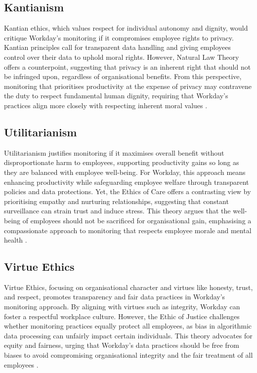 \documentclass[a4paper]{article}
\begin{document}
\subsection{Kantianism}
Kantian ethics, which values respect for individual autonomy and dignity, would critique Workday’s monitoring if it compromises employee rights to privacy. Kantian principles call for transparent data handling and giving employees control over their data to uphold moral rights. However, Natural Law Theory offers a counterpoint, suggesting that privacy is an inherent right that should not be infringed upon, regardless of organisational benefits. From this perspective, monitoring that prioritises productivity at the expense of privacy may contravene the duty to respect fundamental human dignity, requiring that Workday’s practices align more closely with respecting inherent moral values \citep{Alge2006}.

\subsection{Utilitarianism}
Utilitarianism justifies monitoring if it maximises overall benefit without disproportionate harm to employees, supporting productivity gains so long as they are balanced with employee well-being. For Workday, this approach means enhancing productivity while safeguarding employee welfare through transparent policies and data protections. Yet, the Ethics of Care offers a contrasting view by prioritising empathy and nurturing relationships, suggesting that constant surveillance can strain trust and induce stress. This theory argues that the well-being of employees should not be sacrificed for organisational gain, emphasising a compassionate approach to monitoring that respects employee morale and mental health \citep{Gerten2019}.

\subsection{Virtue Ethics}
Virtue Ethics, focusing on organisational character and virtues like honesty, trust, and respect, promotes transparency and fair data practices in Workday’s monitoring approach. By aligning with virtues such as integrity, Workday can foster a respectful workplace culture. However, the Ethic of Justice challenges whether monitoring practices equally protect all employees, as bias in algorithmic data processing can unfairly impact certain individuals. This theory advocates for equity and fairness, urging that Workday’s data practices should be free from biases to avoid compromising organisational integrity and the fair treatment of all employees \citep{Moore2018, Sewell2012}.
\end{document}
